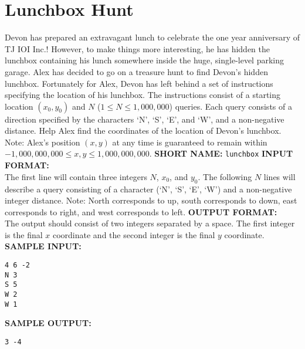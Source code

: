 \section{Lunchbox Hunt}

Devon has prepared an extravagant lunch to celebrate the one year anniversary of TJ IOI Inc.!  However, to make things more interesting, he has hidden the lunchbox containing his lunch somewhere inside the huge, single-level parking garage.
\blank
Alex has decided to go on a treasure hunt to find Devon’s hidden lunchbox. Fortunately for Alex, Devon has left behind a set of instructions specifying the location of his lunchbox. The instructions consist of a starting location $ (x_0, y_0) $ and $ N $ ($ 1 \leq N \leq 1,000,000 $) queries. Each query consists of a direction specified by the characters ‘N’, ‘S’, ‘E’, and ‘W’, and a non-negative distance. Help Alex find the coordinates of the location of Devon’s lunchbox.
\blank
Note: Alex's position $ (x, y) $ at any time is guaranteed to remain within $ -1,000,000,000 \leq x, y \leq 1,000,000,000 $.
\blank
\textbf{SHORT NAME:} \verb|lunchbox|
\blank
\textbf{INPUT FORMAT:}\\
The first line will contain three integers $ N $, $ x_0 $, and $ y_0 $. The following $ N $ lines will describe a query consisting of a character (`N', `S', `E', `W') and a non-negative integer distance.
\blank
Note: North corresponds to up, south corresponds to down, east corresponds to right, and west corresponds to left.
\blank
\textbf{OUTPUT FORMAT:}\\
The output should consist of two integers separated by a space. The first integer is the final $ x $ coordinate and the second integer is the final $ y $ coordinate. 
\blank
\textbf{SAMPLE INPUT:}
\begin{verbatim}
4 6 -2
N 3
S 5
W 2
W 1
\end{verbatim}
\textbf{SAMPLE OUTPUT:}
\begin{verbatim}
3 -4
\end{verbatim}